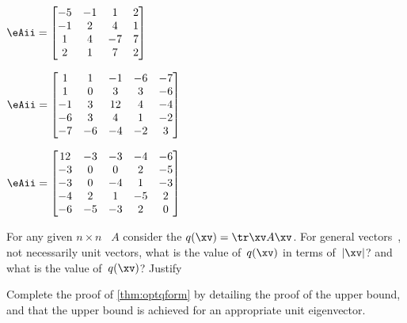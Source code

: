 \begin{exercise}
\begin{Parts}
\begin{OmitV1}
\item \(\eAii=\begin{bmatrix} -5&-1&1&2
\\-1&2&4&1
\\1&4&-7&7
\\2&1&7&2 \end{bmatrix}\)

\item \(\eAii=\begin{bmatrix} 1&1&-1&-6&-7
\\1&0&3&3&-6
\\-1&3&12&4&-4
\\-6&3&4&1&-2
\\-7&-6&-4&-2&3 \end{bmatrix}\)
\end{OmitV1}

\item \(\eAii=\begin{bmatrix} 12&-3&-3&-4&-6
\\-3&0&0&2&-5
\\-3&0&-4&1&-3
\\-4&2&1&-5&2
\\-6&-5&-3&2&0 \end{bmatrix}\)


\end{Parts}
\end{exercise}







\begin{exercise}  
For any given \(n\times n\) ~\(A\) consider the  \(q(\xv)=\tr\xv A\xv\). 
For general vectors~\xv, not necessarily unit vectors, what is the  value of~\(q(\xv)\) in terms of~\(|\xv|\)? and what is the  value of~\(q(\xv)\)?  
Justify 
\end{exercise}





\begin{exercise} \label{ex:optqform} 
Complete the proof of \cref{thm:optqform} by detailing the proof of the upper bound, and that the upper bound is achieved for an appropriate unit eigenvector.
\end{exercise}




